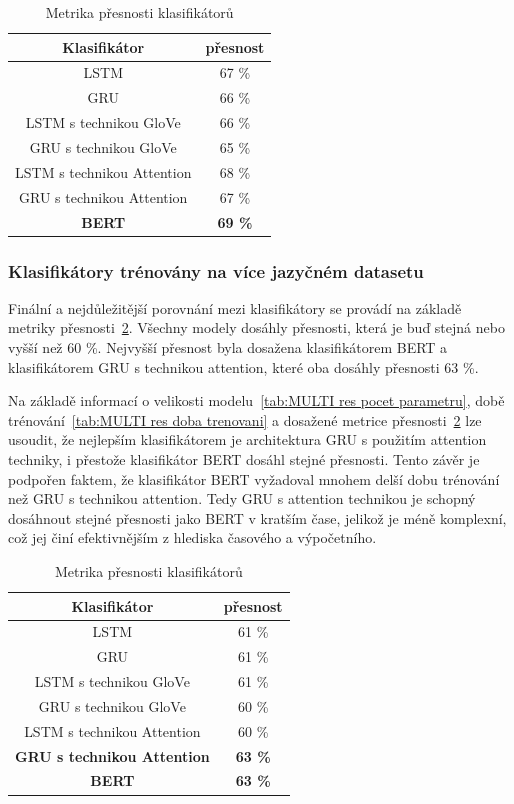 \begin{table}[H]
	\centering
	\caption{Metrika přesnosti klasifikátorů}\label{tab:res metrika presnosti}
	\begin{tabular}{ c c }
			\toprule
			Klasifikátor & přesnost\\
			\midrule
			LSTM & 67 \%\\
			GRU & 66 \%\\         
			LSTM s technikou GloVe & 66 \%\\         
			GRU s technikou GloVe & 65 \%\\         
			LSTM s technikou Attention & 68 \%\\         
			GRU s technikou Attention & 67 \%\\         
			\textbf{BERT} & \textbf{69 \%} \\         
			\midrule
		\end{tabular}
\end{table}

\subsubsection{Klasifikátory trénovány na více jazyčném datasetu}
Finální a nejdůležitější porovnání mezi klasifikátory se provádí na základě metriky přesnosti~\ref{tab:MULTI res metrika presnosti}.
Všechny modely dosáhly přesnosti, která je buď stejná nebo vyšší než 60 \%.
Nejvyšší přesnost byla dosažena klasifikátorem BERT a klasifikátorem GRU s technikou attention, které oba dosáhly přesnosti 63 \%.

Na základě informací o velikosti modelu~\ref{tab:MULTI res pocet parametru}, době trénování~\ref{tab:MULTI res doba trenovani} a dosažené metrice přesnosti~\ref{tab:MULTI res metrika presnosti} lze usoudit, že nejlepším klasifikátorem je architektura GRU s použitím attention techniky, i přestože klasifikátor BERT dosáhl stejné přesnosti.
Tento závěr je podpořen faktem, že klasifikátor BERT vyžadoval mnohem delší dobu trénování než GRU s technikou attention.
Tedy GRU s attention technikou je schopný dosáhnout stejné přesnosti jako BERT v kratším čase, jelikož je méně komplexní, což jej činí efektivnějším z hlediska časového a výpočetního.
\begin{table}[H]
	\centering
	\caption{Metrika přesnosti klasifikátorů}\label{tab:MULTI res metrika presnosti}
	\begin{tabular}{ c c }
			\toprule
			Klasifikátor & přesnost\\
			\midrule
			LSTM & 61 \%\\
			GRU & 61 \%\\         
			LSTM s technikou GloVe & 61 \%\\         
			GRU s technikou GloVe & 60 \%\\         
			LSTM s technikou Attention & 60 \%\\         
			\textbf{GRU s technikou Attention} & \textbf{63 \%}\\         
			\textbf{BERT} & \textbf{63 \%} \\         
			\midrule
		\end{tabular}
\end{table}


